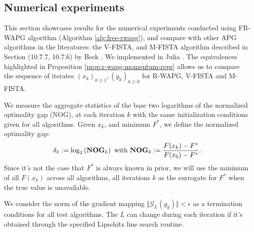 \documentclass[12pt]{article}
\begin{document}
    \subsection{Numerical experiments}
        This section showcases results for the numerical experiments conducted using FR-WAPG algorithm (Algorithm \ref{alg:free-rwapg}), and compare with other APG algorithms in the literatures: the V-FISTA, and M-FISTA algorithm described in Section (10.7.7, 10.7.6) by Beck \cite{beck_first-order_2017}.
        We implemented in Julia \cite{bezanson_julia_2017}.
        The equivalences highlighted in Proposition \ref{prop:r-wapg-momentum-repr} allows us to compare the sequence of iterates $(x_k)_{k \ge 1}, (y_k)_{k \ge0}$ for R-WAPG, V-FISTA and M-FISTA.
        \par
        We measure the aggregate statistics of the base two logarithms of the normalized optimality gap (NOG), at each iteration $k$ with the same initialization conditions given for all algorithms.
        Given $x_k$, and minimum $F^*$, we define the normalized optimality gap:
        \newcommand{\NOG}{\text{\textbf{NOG}}}
        \begin{align*}
            \delta_k := \log_2\left(
                \NOG_k
            \right)
            \text{ with }
            \NOG_k := \frac{F(x_k) - F^*}{F(x_0) - F^*}.
        \end{align*}
        Since it's not the case that $F^*$ is always known in prior, we will use the minimum of all $F(x_k)$ across all algorithms, all iterations $k$ as the surrogate for $F^*$ when the true value is unavailable.
        \par
        We consider the norm of the gradient mapping $\Vert \mathcal G_L(y_k)\Vert < \epsilon$ as a termination conditions for all test algorithms.
        The $L$ can change during each iteration if it's obtained through the specified Lipschitz line search routine.
\end{document}
